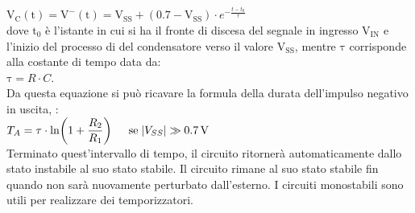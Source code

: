 \documentclass{report}
\begin{document}
\\[4pt]\indent$\displaystyle{\mathrm{V_C(t)}=\mathrm{V^-(t)}=\mathrm{V_{SS}}+(0.7-\mathrm{V_{SS}}) \cdot e^{-\frac{t-t_0}{\tau}}}$
\\[2pt]dove $\mathrm{t_0}$ è l'istante in cui si ha il fronte di discesa del segnale in ingresso $\mathrm{V_{IN}}$ e l'inizio del processo di  del condensatore verso il valore $\mathrm{V_{SS}}$, mentre $\mathrm{\tau}$ corrisponde alla costante di tempo data da: \\\indent$\displaystyle{\mathrm{\tau}= R \cdot C}$.
\\Da questa equazione si può ricavare la formula della durata dell'impulso negativo in uscita, :
\\[4pt]\indent$\displaystyle{T_A=\tau\cdot\ln\biggl(1+\frac{R_2}{R_1}\biggr)\indent \mathrm{se\;}|V_{SS}|\gg\SI{0.7}{\volt}}$
\\[4pt]Terminato quest'intervallo di tempo, il circuito ritornerà automaticamente dallo stato instabile al suo stato stabile. Il circuito rimane al suo stato stabile fin quando non sarà nuovamente perturbato dall'esterno. I circuiti monostabili sono utili per realizzare dei temporizzatori.
\end{document}
